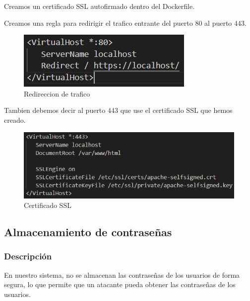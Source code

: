 \documentclass{report}
\begin{document}
                    Creamos un certificado SSL autofirmado dentro del Dockerfile.
                    
                    Creamos una regla para redirigir el trafico entrante del puerto 80 al puerto 443.
                    \begin{figure}[H]
                        \centering
                        \includegraphics[width=\textwidth]{./img/vulnerabilidades/3.2/1.1.png}
                        \caption{Redireccion de trafico}
                    \end{figure}
                    
                    Tambien debemos decir al puerto 443 que use el certificado SSL que hemos creado.
                    \begin{figure}[H]
                        \centering
                        \includegraphics[width=\textwidth]{./img/vulnerabilidades/3.2/1.2.png}
                        \caption{Certificado SSL}
                    \end{figure}
            \clearpage
            \subsection{Almacenamiento de contraseñas}
                \subsubsection{Descripción}
                    En nuestro sistema, no se almacenan las contraseñas de los usuarios de forma segura, lo que permite que un atacante pueda obtener las contraseñas de los usuarios.
\end{document}
